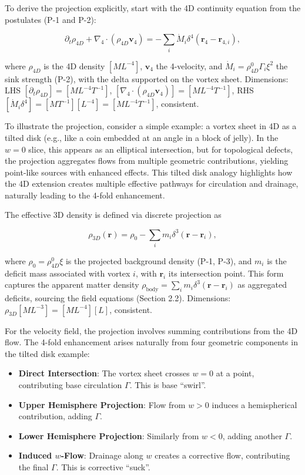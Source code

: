 To derive the projection explicitly, start with the 4D continuity equation from the postulates (P-1 and P-2):

\begin{equation}
\partial_t \rho_{4D} + \nabla_4 \cdot (\rho_{4D} \mathbf{v}_4) = -\sum_i \dot{M}_i \delta^4(\mathbf{r}_4 - \mathbf{r}_{4,i}),
\end{equation}

where $\rho_{4D}$ is the 4D density $[M L^{-4}]$, $\mathbf{v}_4$ the 4-velocity, and $\dot{M}_i = \rho_{4D}^0 \Gamma_i \xi^2$ the sink strength (P-2), with the delta supported on the vortex sheet. Dimensions: LHS $[\partial_t \rho_{4D}] = [M L^{-4} T^{-1}]$, $[\nabla_4 \cdot (\rho_{4D} \mathbf{v}_4)] = [M L^{-4} T^{-1}]$, RHS $[\dot{M}_i \delta^4] = [M T^{-1}] [L^{-4}] = [M L^{-4} T^{-1}]$, consistent.

To illustrate the projection, consider a simple example: a vortex sheet in 4D as a tilted disk (e.g., like a coin embedded at an angle in a block of jelly). In the $w=0$ slice, this appears as an elliptical intersection, but for topological defects, the projection aggregates flows from multiple geometric contributions, yielding point-like sources with enhanced effects. This tilted disk analogy highlights how the 4D extension creates multiple effective pathways for circulation and drainage, naturally leading to the 4-fold enhancement.

The effective 3D density is defined via discrete projection as

\begin{equation}
\rho_{3D}(\mathbf{r}) = \rho_0 - \sum_i m_i \delta^3(\mathbf{r} - \mathbf{r}_i),
\end{equation}

where $\rho_0 = \rho_{4D}^0 \xi$ is the projected background density (P-1, P-3), and $m_i$ is the deficit mass associated with vortex $i$, with $\mathbf{r}_i$ its intersection point. This form captures the apparent matter density $\rho_{\text{body}} = \sum_i m_i \delta^3(\mathbf{r} - \mathbf{r}_i)$ as aggregated deficits, sourcing the field equations (Section 2.2). Dimensions: $\rho_{3D} [M L^{-3}] = [M L^{-4}] [L]$, consistent.

For the velocity field, the projection involves summing contributions from the 4D flow. The 4-fold enhancement arises naturally from four geometric components in the tilted disk example:

\begin{itemize}
\item \textbf{Direct Intersection}: The vortex sheet crosses $w=0$ at a point, contributing base circulation $\Gamma$. This is base ``swirl''.
\item \textbf{Upper Hemisphere Projection}: Flow from $w>0$ induces a hemispherical contribution, adding $\Gamma$.
\item \textbf{Lower Hemisphere Projection}: Similarly from $w<0$, adding another $\Gamma$.
\item \textbf{Induced $w$-Flow}: Drainage along $w$ creates a corrective flow, contributing the final $\Gamma$. This is corrective ``suck''.
\end{itemize}

